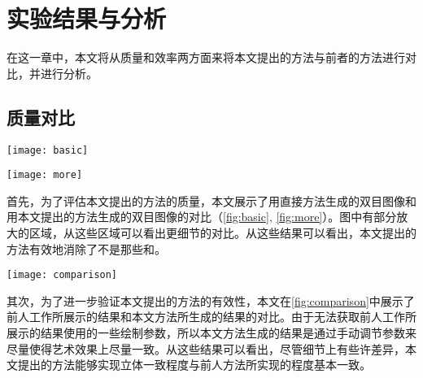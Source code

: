 \chapter{实验结果与分析}

在这一章中，本文将从质量和效率两方面来将本文提出的方法与前者的方法进行对比，并进行分析。

\section{质量对比}

\begin{figure*}[!t]
    \centering
    \texttt{[image: basic]}
    \caption{\label{fig:basic}
    用直接方法生成的双目图像和用本文提出的方法生成的双目图像的对比。推荐使用三维红蓝眼镜来获得更好的观察体验。最右边展示的是在\stc{}结果上进行进一步风格化的结果。使用的三维模型来自DeCarlo等人的工作\cite{DFRS03}。
    }
\end{figure*}
  
\begin{figure*}[!t]
    \centering
    \texttt{[image: more]}
    \caption{\label{fig:more}
    更多用直接方法生成的双目图像和用本文提出的方法生成的双目图像的对比。
    }
\end{figure*}

首先，为了评估本文提出的方法的质量，本文展示了用直接方法生成的双目图像和用本文提出的方法生成的双目图像的对比（\autoref{fig:basic}, \autoref{fig:more}）。图中有部分放大的区域，从这些区域可以看出更细节的对比。从这些结果可以看出，本文提出的方法有效地消除了不是\stc{}那些\con{}和\scon{}。

\begin{figure*}[!t]
    \centering
    \texttt{[image: comparison]}
    \caption{\label{fig:comparison}
    前人工作\cite{kim2013stereoscopic,bukenberger2018stereo}所展示的结果和本文方法所生成的结果的对比。由于无法获取前人工作所展示结果使用的一些绘制参数，所以本文方法生成的结果是通过手动调节参数来尽量使得艺术效果上尽量一致。但是由于使用的模型或者轮廓线绘制算法实现上的差异，部分细节仍会有所出入。天马的图像是根据深度对笔画宽度进行风格化的结果。使用的模型来自IMATI和CNR的AIM@SHAPE-VISIONAIR Shape Repository\cite{INR04}。}
\end{figure*}  

其次，为了进一步验证本文提出的方法的有效性，本文在\autoref{fig:comparison}中展示了前人工作\cite{kim2013stereoscopic,bukenberger2018stereo}所展示的结果和本文方法所生成的结果的对比。由于无法获取前人工作所展示的结果使用的一些绘制参数，所以本文方法生成的结果是通过手动调节参数来尽量使得艺术效果上尽量一致。从这些结果可以看出，尽管细节上有些许差异，本文提出的方法能够实现立体一致程度与前人方法所实现的程度基本一致。

